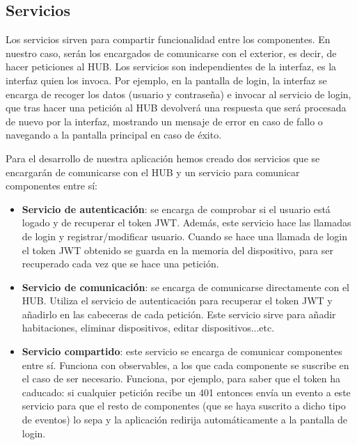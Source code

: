 \subsection{Servicios}
Los servicios sirven para compartir funcionalidad entre los componentes. En nuestro caso, serán los encargados de comunicarse con el exterior, es decir, de hacer peticiones al HUB.
Los servicios son independientes de la interfaz, es la interfaz quien los invoca. Por ejemplo, en la pantalla de login, la interfaz se encarga de recoger los datos (usuario y
contraseña) e invocar al servicio de login, que tras hacer una petición al HUB devolverá una respuesta que será procesada de nuevo por la interfaz, mostrando un mensaje de error en
caso de fallo o navegando a la pantalla principal en caso de éxito.
\par
Para el desarrollo de nuestra aplicación hemos creado dos servicios que se encargarán de comunicarse con el HUB y un servicio para comunicar componentes entre sí:
\begin{itemize}
\item\textbf{Servicio de autenticación}: se encarga de comprobar si el usuario está logado y de recuperar el token JWT. Además, este servicio hace las llamadas de login y registrar/modificar
usuario. Cuando se hace una llamada de login el token JWT obtenido se guarda en la memoria del dispositivo, para ser recuperado cada vez que se hace una petición.
\item\textbf{Servicio de comunicación}: se encarga de comunicarse directamente con el HUB. Utiliza el servicio de autenticación para recuperar el token JWT y añadirlo en las cabeceras de 
cada petición. Este servicio sirve para añadir habitaciones, eliminar dispositivos, editar dispositivos...etc.
\item\textbf{Servicio compartido}: este servicio se encarga de comunicar componentes entre sí. Funciona con observables, a los que cada componente se suscribe en el caso de ser necesario.
Funciona, por ejemplo, para saber que el token ha caducado: si cualquier petición recibe un 401 entonces envía un evento a este servicio para que el resto de componentes (que se haya suscrito
a dicho tipo de eventos) lo sepa y la aplicación redirija automáticamente a la pantalla de login.
\end{itemize}

